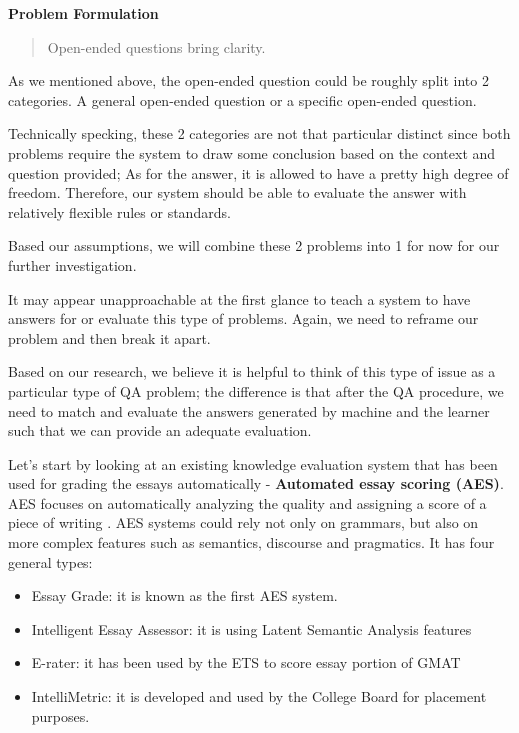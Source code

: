 \documentclass[]{book}
\theoremstyle{definition}
\theoremstyle{definition}
\theoremstyle{definition}
\theoremstyle{remark}
\begin{document}
\textbf{Problem Formulation}

\begin{quote}
Open-ended questions bring clarity.
\end{quote}

As we mentioned above, the open-ended question could be roughly split
into 2 categories. A general open-ended question or a specific
open-ended question.

Technically specking, these 2 categories are not that particular
distinct since both problems require the system to draw some conclusion
based on the context and question provided; As for the answer, it is
allowed to have a pretty high degree of freedom. Therefore, our system
should be able to evaluate the answer with relatively flexible rules or
standards.

Based our assumptions, we will combine these 2 problems into 1 for now
for our further investigation.

It may appear unapproachable at the first glance to teach a system to
have answers for or evaluate this type of problems. Again, we need to
reframe our problem and then break it apart.

Based on our research, we believe it is helpful to think of this type of
issue as a particular type of QA problem; the difference is that after
the QA procedure, we need to match and evaluate the answers generated by
machine and the learner such that we can provide an adequate evaluation.

Let's start by looking at an existing knowledge evaluation system that
has been used for grading the essays automatically - \textbf{Automated
essay scoring (AES)}. AES focuses on automatically analyzing the quality
and assigning a score of a piece of writing . AES systems could rely not
only on grammars, but also on more complex features such as semantics,
discourse and pragmatics. It has four general types:

\begin{itemize}
\item
  Essay Grade: it is known as the first AES system.
\item
  Intelligent Essay Assessor: it is using Latent Semantic Analysis
  features
\item
  E-rater: it has been used by the ETS to score essay portion of GMAT
\item
  IntelliMetric: it is developed and used by the College Board for
  placement purposes.
\end{itemize}
\end{document}
